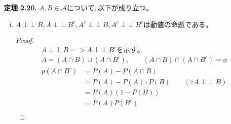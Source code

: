 \documentclass[dvipdfmx,10pt, a4j]{jarticle}
\newcommand{\indepe}{\mathop{\perp\!\!\!\perp}}
\theoremstyle{definition}
\begin{document}
    \noindent
    \textbf{定理 2.20.} $A, B \in \mathcal{A} について,以下が成り立つ。$\\
    \begin{enumerate}[i)]
        \item $A \indepe B, A \indepe B^{c}, A^{c} \indepe B, A^{c} \indepe B^{c} は動値の命題である。$
        \begin{proof}
            \begin{align*}
                A \indepe B => A \indepe B^{c} を示す。\\
                A = (A \cap B) \cup (A \cap B^{c}), \qquad (A \cap B) \cap (A \cap B^{c}) = \phi
            \end{align*}
            \begin{align*}
                p(A \cap B^{c}) &= P(A) - P(A \cap B)\\
                &= P(A) - P(A) \cdot P(B) \qquad (\because{A \indepe B}) \\
                &= P(A)(1-P(B))\\
                &= P(A)P(B^{c})\\
            \end{align*}
        \end{proof}
        

\end{enumerate}
\end{document}
